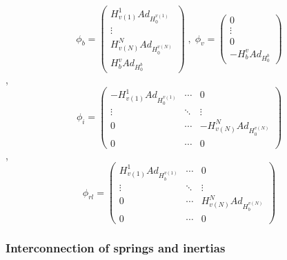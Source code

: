 \documentclass[a4paper,twoside, openright,12pt]{report}
\begin{document}
\[\phi_b = \begin{pmatrix}H_{v(1)}^1 Ad_{H_0^{v(1)}} \\ \vdots \\ H_{v(N)}^N Ad_{H_0^{v(N)}} \\ H_b^v Ad_{H_0^b}\end{pmatrix} \; , \;
\phi_v = \begin{pmatrix}0 \\ \vdots \\ 0 \\ - H_b^v Ad_{H_0^b}
\end{pmatrix} \],
\[\phi_i =  \begin{pmatrix} -H_{v(1)}^1 Ad_{H_0^{v(1)}} & \cdots & 0 \\ \vdots & \ddots & \vdots \\ 0 & \cdots & -H_{v(N)}^N Ad_{H_0^{v(N)}} \\
0 & \cdots & 0\end{pmatrix} \], \[
\phi_{rl} = \begin{pmatrix} H_{v(1)}^1 Ad_{H_b^{v(1)}} & \cdots & 0 \\ \vdots & \ddots & \vdots \\ 0 & \cdots & H_{v(N)}^N Ad_{H_b^{v(N)}} \\
0 & \cdots & 0\end{pmatrix} \]

\subsubsection{Interconnection of springs and inertias}
\end{document}
